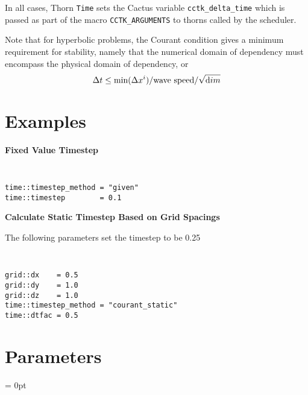 \documentclass{article}
\newlength{\tableWidth} \newlength{\maxVarWidth} \newlength{\paraWidth} \newlength{\descWidth}
\begin{document}
In all cases, Thorn {\tt Time} sets the Cactus variable {\tt cctk\_delta\_time}
which is passed as part of the macro {\tt CCTK\_ARGUMENTS} to thorns called 
by the scheduler.

Note that for hyperbolic problems, the Courant condition gives a minimum 
requirement for stability, namely that the numerical domain of dependency
must encompass the physical domain of dependency, or
$$
\Delta t \le \mbox{min}(\Delta x^i)/\mbox{wave speed}/\sqrt{\mbox dim}
$$

\section{Examples}

\noindent
{\bf Fixed Value Timestep}

{\tt
\begin{verbatim}
time::timestep_method = "given"
time::timestep        = 0.1
\end{verbatim}
}


\noindent
{\bf Calculate Static Timestep Based on Grid Spacings}

\noindent
The following parameters set the timestep to be 0.25

{\tt
\begin{verbatim}
grid::dx    = 0.5
grid::dy    = 1.0
grid::dz    = 1.0
time::timestep_method = "courant_static"
time::dtfac = 0.5
\end{verbatim}
}




\section{Parameters} 


\parskip = 0pt

\setlength{\tableWidth}{160mm}

\setlength{\paraWidth}{\tableWidth}
\setlength{\descWidth}{\tableWidth}
\settowidth{\maxVarWidth}{timestep\_outevery}

\addtolength{\paraWidth}{-\maxVarWidth}
\addtolength{\paraWidth}{-\columnsep}
\addtolength{\paraWidth}{-\columnsep}
\addtolength{\paraWidth}{-\columnsep}
\end{document}
